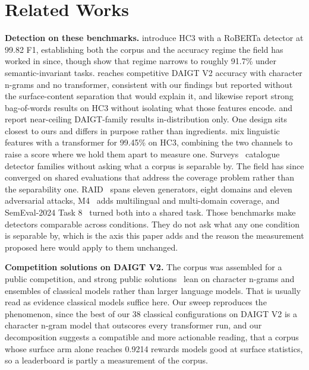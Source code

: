 \documentclass[conference,a4paper]{IEEEtran}
\begin{document}
\section{Related Works}
\label{sec:related}

\textbf{Detection on these benchmarks.} \citet{Guo2023close} introduce HC3 with a RoBERTa detector at 99.82 F1, establishing both the corpus and the accuracy regime the field has worked in since, though \citet{Su2023plus} show that regime narrows to roughly 91.7\% under semantic-invariant tasks. \citet{Zhou2024exploiting} reaches competitive DAIGT V2 accuracy with character n-grams and no transformer, consistent with our findings but reported without the surface-content separation that would explain it, and \citet{Kubrusly2025detecting} likewise report strong bag-of-words results on HC3 without isolating what those features encode. \citet{Ansary2026multirepresentation} and \citet{Lamsiyah2025daigt} report near-ceiling DAIGT-family results in-distribution only. One design sits closest to ours and differs in purpose rather than ingredients. \citet{Annepaka2026synergizing} mix linguistic features with a transformer for 99.45\% on HC3, combining the two channels to raise a score where we hold them apart to measure one. Surveys~\cite{Crothers2023machine} catalogue detector families without asking what a corpus is separable by. The field has since converged on shared evaluations that address the coverage problem rather than the separability one. RAID~\cite{Dugan2024raid} spans eleven generators, eight domains and eleven adversarial attacks, M4~\cite{Wang2024m4} adds multilingual and multi-domain coverage, and SemEval-2024 Task 8~\cite{Wang2024semeval} turned both into a shared task. Those benchmarks make detectors comparable across conditions. They do not ask what any one condition is separable by, which is the axis this paper adds and the reason the measurement proposed here would apply to them unchanged.

\textbf{Competition solutions on DAIGT V2.} The corpus was assembled for a public competition, and strong public solutions~\cite{Zain2025multi} lean on character n-grams and ensembles of classical models rather than larger language models. That is usually read as evidence classical models suffice here. Our sweep reproduces the phenomenon, since the best of our 38 classical configurations on DAIGT V2 is a character n-gram model that outscores every transformer run, and our decomposition suggests a compatible and more actionable reading, that a corpus whose surface arm alone reaches 0.9214 rewards models good at surface statistics, so a leaderboard is partly a measurement of the corpus.
\end{document}

